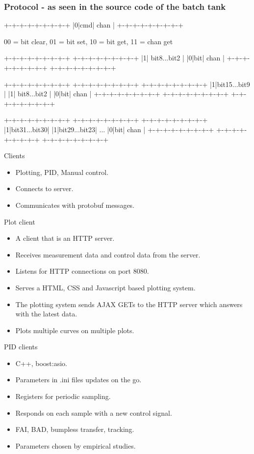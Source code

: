 \documentclass{beamer}
\begin{document}
\begin{frame}[fragile]
    \frametitle{Protocol - as seen in the source code of the batch tank}
        \small
\begin{semiverbatim}
+-+-+-+-+-+-+-+-+
|0|cmd|  chan   | 
+-+-+-+-+-+-+-+-+

00 = bit clear, 01 = bit set, 10 = bit get, 11 = chan get

+-+-+-+-+-+-+-+-+  +-+-+-+-+-+-+-+-+ 
|1| bit8...bit2 |  |0|bit|  chan   |
+-+-+-+-+-+-+-+-+  +-+-+-+-+-+-+-+-+ 

+-+-+-+-+-+-+-+-+  +-+-+-+-+-+-+-+-+  +-+-+-+-+-+-+-+-+ 
|1|bit15...bit9 |  |1| bit8...bit2 |  |0|bit|  chan   |
+-+-+-+-+-+-+-+-+  +-+-+-+-+-+-+-+-+  +-+-+-+-+-+-+-+-+ 
 
+-+-+-+-+-+-+-+-+  +-+-+-+-+-+-+-+-+     +-+-+-+-+-+-+-+-+ 
|1|bit31...bit30|  |1|bit29...bit23| ... |0|bit|  chan   |
+-+-+-+-+-+-+-+-+  +-+-+-+-+-+-+-+-+     +-+-+-+-+-+-+-+-+ 
\end{semiverbatim}
\end{frame}


\begin{frame}{Clients}
	\begin{itemize}
   		\item Plotting, PID, Manual control.
        \item Connects to server.
		\item Communicates with protobuf messages.
    \end{itemize}
\end{frame}

\begin{frame}{Plot client}
	\begin{itemize}
    	\item A client that is an HTTP server.
        \item Receives measurement data and control data from the server.
        \item Listens for HTTP connections on port 8080.
        \item Serves a HTML, CSS and Javascript based plotting system.
        \item The plotting system sends AJAX GETs to the HTTP server which answers with the latest data.
        \item Plots multiple curves on multiple plots.
    \end{itemize}
\end{frame}

\begin{frame}{PID clients}
	\begin{itemize}
		\item C++, boost:asio.
		\item Parameters in .ini files updates on the go.
		\item Registers for periodic sampling.
		\item Responds on each sample with a new control signal.
		\item FAI, BAD, bumpless transfer, tracking.
		\item Parameters chosen by empirical studies.
	\end{itemize}
\end{frame}
\end{document}
